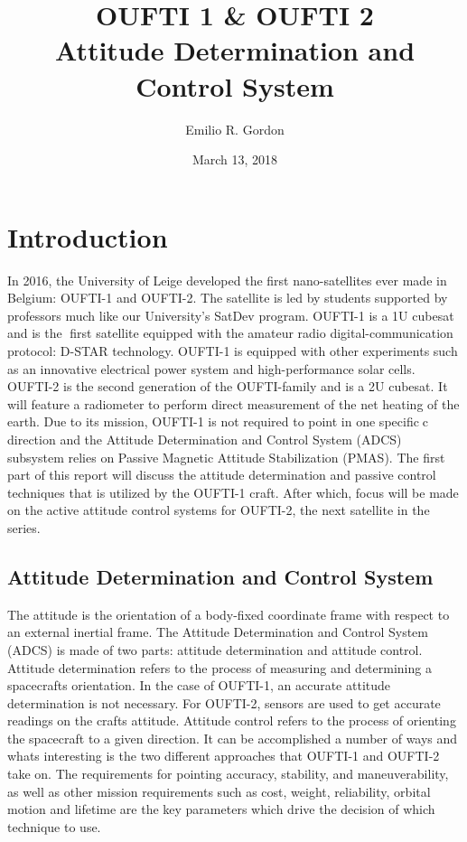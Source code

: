 \documentclass[12pt]{article}
\title{OUFTI 1 \& OUFTI 2 \\
  \large Attitude Determination and Control System}
\author{Emilio R. Gordon}
\date{March 13, 2018}
\begin{document}
\maketitle
{\singlespacing
\tableofcontents}
\newpage
\section{Introduction }
In 2016, the University of Leige developed the first nano-satellites ever made in Belgium: OUFTI-1 and OUFTI-2. The satellite is led by students supported by professors much like our University's SatDev program. OUFTI-1 is a 1U cubesat and is the first satellite equipped with the amateur radio digital-communication protocol: D-STAR technology. OUFTI-1 is equipped with other experiments such as an innovative electrical power system and high-performance solar cells.  OUFTI-2 is the second generation of the OUFTI-family and is a 2U cubesat. It will feature a radiometer to perform direct measurement of the net heating of the earth. 
\newline \newline
Due to its mission, OUFTI-1 is not required to point in one specificc direction and the Attitude Determination and Control System (ADCS) subsystem relies on Passive Magnetic Attitude Stabilization (PMAS). The first part of this report will discuss the attitude determination and passive control techniques that is utilized by the OUFTI-1 craft. After which, focus will be made on the active attitude control systems for OUFTI-2, the next satellite in the series. 
\subsection{Attitude Determination and Control System}
The attitude is the orientation of a body-fixed coordinate frame with respect to an external inertial frame. The Attitude Determination and Control System (ADCS) is made of two parts: attitude determination and attitude control.
\newline \newline
Attitude determination refers to the process of measuring and determining a spacecrafts orientation. In the case of OUFTI-1, an accurate attitude determination is not necessary. For OUFTI-2, sensors are used to get accurate readings on the crafts attitude. 
\newline \newline
Attitude control refers to the process of orienting the spacecraft to a given direction. It can be accomplished a number of ways and whats interesting is the two different approaches that OUFTI-1 and OUFTI-2 take on. The requirements for pointing accuracy, stability, and maneuverability, as well as other mission requirements such as cost, weight, reliability, orbital motion and lifetime are the key parameters which drive the decision of which technique to use. 
\end{document}
